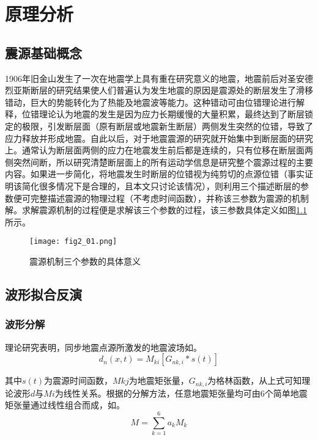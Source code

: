 

\chapter{原理分析}

\section{震源基础概念}
1906年旧金山发生了一次在地震学上具有重在研究意义的地震，地震前后对圣安德烈亚斯断层的研究结果\citep{Milne1910}使人们普遍认为发生地震的原因是震源处的断层发生了滑移错动，巨大的势能转化为了热能及地震波等能力。这种错动可由位错理论进行解释，位错理论认为地震的发生是因为应力长期缓慢的大量积累，最终达到了断层锁定的极限，引发断层面（原有断层或地震新生断层）两侧发生突然的位错，导致了应力释放并形成地震。自此以后，对于地震震源的研究就开始集中到断层面的研究上。通常认为断层面两侧的应力在地震发生前后都是连续的，只有位移在断层面两侧突然间断，所以研究清楚断层面上的所有运动学信息是研究整个震源过程的主要内容。如果进一步简化，将地震发生时断层的位错视为纯剪切的点源位错（事实证明该简化很多情况下是合理的，且本文只讨论该情况），则利用三个描述断层的参数便可完整描述震源的物理过程（不考虑时间函数），并称该三参数为震源的机制解。求解震源机制的过程便是求解该三个参数的过程，该三参数具体定义如图\ref{fig2_01}所示。
\begin{figure}
\centering
  \texttt{[image: fig2\_01.png]} 
  \caption{震源机制三个参数的具体意义}
  \label{fig2_01}
\end{figure}

\section{波形拟合反演}

\subsection{波形分解}
理论研究表明，同步地震点源\citep{Silver1982}所激发的地震波场如\citep{Jost1989}。
\begin{equation}
\label{eq2_01}
d_n(x,t)=M_{ki}[G_{nk,i}*s(t)]
\end{equation}

其中$s(t)$为震源时间函数，$Mkj$为地震矩张量，$G_{nk,i}$为格林函数，从上式可知理论波形$d$与$Mi$为线性关系。根据\citet{Kikuchi1991}的分解方法，任意地震矩张量均可由6个简单地震矩张量通过线性组合而成，如。
\begin{equation}
\label{eq2_02}
M=\sum_{k=1}^6a_kM_k
\end{equation}

